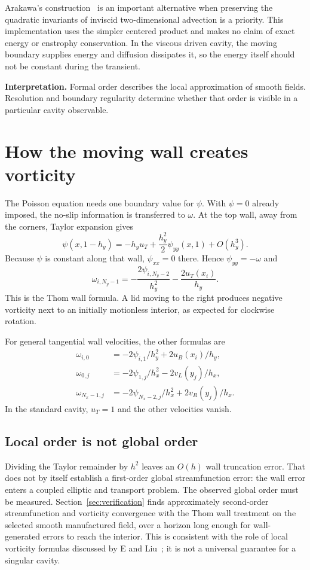 \documentclass[11pt,a4paper]{article}
\newcommand{\takeaway}[1]{\par\smallskip\noindent\colorbox{teal!7}{\parbox{\dimexpr\linewidth-2\fboxsep}{\textbf{\color{teal}Interpretation.} #1}}\par\smallskip}
\begin{document}
Arakawa's construction~\cite{arakawa1966} is an important alternative when
preserving the quadratic invariants of inviscid two-dimensional advection is
a priority. This implementation uses the simpler centered product and makes
no claim of exact energy or enstrophy conservation. In the viscous driven
cavity, the moving boundary supplies energy and diffusion dissipates it, so
the energy itself should not be constant during the transient.

\takeaway{Formal order describes the local approximation of smooth fields.
Resolution and boundary regularity determine whether that order is visible in
a particular cavity observable.}

\clearpage
\section{How the moving wall creates vorticity}
The Poisson equation needs one boundary value for $\psi$. With $\psi=0$
already imposed, the no-slip information is transferred to $\omega$.
At the top wall, away from the corners, Taylor expansion gives
\begin{equation}
\psi(x,1-h_y)=-h_y u_T+\frac{h_y^2}{2}\psi_{yy}(x,1)+O(h_y^3).
\end{equation}
Because $\psi$ is constant along that wall, $\psi_{xx}=0$ there. Hence
$\psi_{yy}=-\omega$ and
\begin{equation}
\boxed{\omega_{i,N_y-1}=-\frac{2\psi_{i,N_y-2}}{h_y^2}
-\frac{2u_T(x_i)}{h_y}.}\label{eq:thom}
\end{equation}
This is the Thom wall formula. A lid moving to the right produces negative
vorticity next to an initially motionless interior, as expected for clockwise
rotation.

For general tangential wall velocities, the other formulas are
\begin{align}
\omega_{i,0}&=-2\psi_{i,1}/h_y^2+2u_B(x_i)/h_y,\\
\omega_{0,j}&=-2\psi_{1,j}/h_x^2-2v_L(y_j)/h_x,\\
\omega_{N_x-1,j}&=-2\psi_{N_x-2,j}/h_x^2+2v_R(y_j)/h_x.
\end{align}
In the standard cavity, $u_T=1$ and the other velocities vanish.

\subsection{Local order is not global order}
Dividing the Taylor remainder by $h^2$ leaves an $O(h)$ wall truncation error.
That does not by itself establish a first-order global streamfunction error:
the wall error enters a coupled elliptic and transport problem. The observed
global order must be measured. Section~\ref{sec:verification} finds approximately second-order
streamfunction and vorticity convergence with the Thom wall treatment on the
selected smooth manufactured field, over a horizon long enough for
wall-generated errors to reach the interior. This
is consistent with the role of local vorticity formulas discussed by
E and Liu~\cite{eliu1996}; it is not a universal guarantee for a singular cavity.
\end{document}
